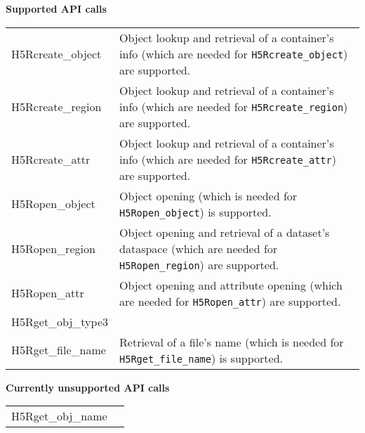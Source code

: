 \documentclass[../users_guide.tex]{subfiles}
\begin{document}
\begin{center}

\textbf{Supported API calls}
\vspace{.2in} \\

\begin{tabularx}{\linewidth}{| X | >{\RaggedRight}X |}
\hline
\rowcolor{lightgray!50}%
\multicolumn{1}{| c |}{\textbf{API call}} & \multicolumn{1}{c |}{\textbf{Notes}} \\ \hline

H5Rcreate\_object & Object lookup and retrieval of a container's info (which are needed for \texttt{H5Rcreate\_object}) are supported.\\ \hline
H5Rcreate\_region & Object lookup and retrieval of a container's info (which are needed for \texttt{H5Rcreate\_region}) are supported.\\ \hline
H5Rcreate\_attr & Object lookup and retrieval of a container's info (which are needed for \texttt{H5Rcreate\_attr}) are supported.\\ \hline
H5Ropen\_object & Object opening (which is needed for \texttt{H5Ropen\_object}) is supported.\\ \hline
H5Ropen\_region & Object opening and retrieval of a dataset's dataspace (which are needed for \texttt{H5Ropen\_region}) are supported.\\ \hline
H5Ropen\_attr & Object opening and attribute opening (which are needed for \texttt{H5Ropen\_attr}) are supported.\\ \hline
H5Rget\_obj\_type3 & \\ \hline
H5Rget\_file\_name & Retrieval of a file's name (which is needed for \texttt{H5Rget\_file\_name}) is supported.\\ \hline

\end{tabularx}

\textbf{Currently unsupported API calls}
\vspace{.2in} \\

\begin{tabularx}{\linewidth}{| X | >{\RaggedRight}X |}
\hline
\rowcolor{lightgray!50}%
\multicolumn{1}{| c |}{\textbf{API call}} & \multicolumn{1}{c |}{\textbf{Notes}} \\ \hline

H5Rget\_obj\_name & \\ \hline

\end{tabularx}

\end{center}
\end{document}
